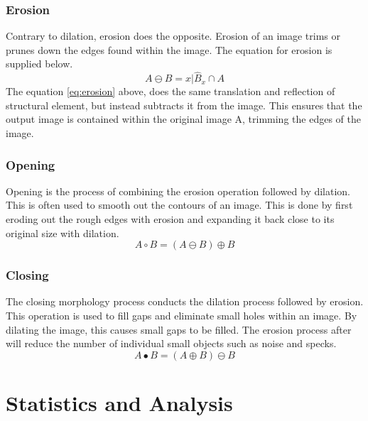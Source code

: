 
\subsubsection{Erosion}
Contrary to dilation, erosion does the opposite. Erosion of an image trims or prunes down the edges found within the image. The equation for erosion is supplied below.
\begin{equation}
A \ominus B = {x | \hat{B}_x \cap A }
\label{eq:erosion}
\end{equation}
The equation \ref{eq:erosion} above,  does the same translation and reflection of structural element, but instead subtracts it from the image. This ensures that the output image is contained within the original image A, trimming the edges of the image. 

\subsubsection{Opening}
Opening is the process of combining the erosion operation followed by dilation. This is often used to smooth out the contours of an image. This is done by first eroding out the rough edges with erosion and expanding it back close to its original size with dilation.
\begin{equation}
A \circ B = (A \ominus B) \oplus B
\label{eq:open}
\end{equation}

\subsubsection{Closing}
The closing morphology process conducts the dilation process followed by erosion. This operation is used to fill gaps and eliminate small holes within an image. By dilating the image, this causes small gaps to be filled. The erosion process after will reduce the number of individual small objects such as noise and specks.
\begin{equation}
A \bullet B = (A \oplus B) \ominus B
\label{eq:close}
\end{equation}

\section{Statistics and Analysis}